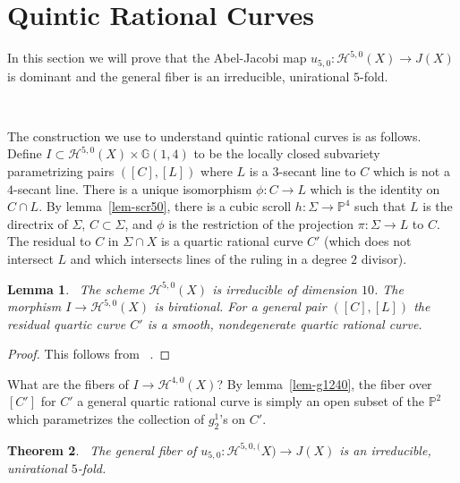 \documentclass[amssymb,twoside,12 pt,amscd,reqno]{amsart}
\theoremstyle{plain}
\newtheorem{thm}{Theorem}[section]
\newtheorem{lem}[thm]{Lemma}
\theoremstyle{definition}
\newcommand{\Hdg}[2]{\mathcal{H}^{#1,#2}}
\newcommand{\PP}{\mathbb{P}}
\begin{document}
\section{Quintic Rational Curves}

In this section we will prove that the Abel-Jacobi map
$u_{5,0}:\Hdg{5}{0}(X)\rightarrow J(X)$ is dominant and the general
fiber is an irreducible, unirational $5$-fold.  

\

The construction we use to understand quintic rational curves is as
follows.  Define $I\subset \Hdg{5}{0}(X)\times \mathbb{G}(1,4)$ to be
the locally closed subvariety parametrizing pairs $([C],[L])$ where
$L$ is a $3$-secant line to $C$ which is not a $4$-secant line.  There
is a unique isomorphism $\phi:C\rightarrow L$ which is the identity on
$C\cap L$.  By lemma~\ref{lem-scr50}, there is a cubic scroll
$h:\Sigma\rightarrow\PP^4$ such that $L$ is the directrix of $\Sigma$,
$C\subset \Sigma$, and $\phi$ is the restriction of the projection
$\pi:\Sigma\rightarrow L$ to $C$.  The residual to $C$ in $\Sigma\cap
X$ is a quartic rational curve $C'$ (which does not intersect $L$ and which
intersects lines of the ruling in a degree $2$ divisor).  

\begin{lem}~\label{lem-irr50}
The scheme $\Hdg{5}{0}(X)$ is irreducible of dimension $10$.  The
morphism $I\rightarrow \Hdg{5}{0}(X)$ is birational.  For a general
pair $([C],[L])$ the residual quartic curve $C'$ is a smooth,
nondegenerate quartic rational curve.
\end{lem}

\begin{proof}
This follows from ~\cite[corollary 9.3, theorem 9.4]{HRS1}.  
\end{proof}  

What are the fibers of $I\rightarrow \Hdg{4}{0}(X)$?  By
lemma~\ref{lem-g1240}, the fiber over $[C']$ for $C'$ a general
quartic rational curve is simply an open subset of the $\PP^2$ which
parametrizes the 
collection of $g^1_2$'s on $C'$.  

\begin{thm}~\label{thm-urfib3}  The general fiber of
$u_{5,0}:\Hdg{5,0}(X)\rightarrow J(X)$ is an irreducible, unirational
$5$-fold.
\end{thm}
\end{document}

